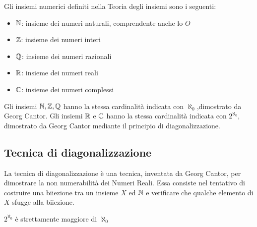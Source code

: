 
Gli insiemi numerici definiti nella Teoria degli insiemi sono i seguenti:
\begin{itemize}
  \item $\mathbb{N}$: insieme dei numeri naturali, comprendente anche lo $O$
  \item $\mathbb{Z}$: insieme dei numeri interi
  \item $\mathbb{Q}$: insieme dei numeri razionali
  \item $\mathbb{R}$: insieme dei numeri reali
  \item $\mathbb{C}$: insieme dei numeri complessi
\end{itemize}
Gli insiemi $\mathbb{N}, \mathbb{Z}, \mathbb{Q}$ hanno la stessa cardinalità indicata con $\aleph_0$,dimostrato da Georg Cantor.\newline
Gli insiemi $\mathbb{R}$ e $\mathbb{C}$ hanno la stessa cardinalità indicata con $ 2 ^ {\aleph_0}$,
dimostrato da Georg Cantor mediante il principio di diagonalizzazione.

\subsection{Tecnica di diagonalizzazione}
La tecnica di diagonalizzazione è una tecnica, inventata da Georg Cantor, per dimostrare la
non numerabilità dei Numeri Reali.\newline
Essa consiste nel tentativo di costruire una biiezione tra un insieme $X$ ed $\mathbb{N}$
e verificare che qualche elemento di $X$ sfugge alla biiezione.

\begin{thm}
    $2^{\aleph_0}$ è strettamente maggiore di $\aleph_0$
\end{thm}

